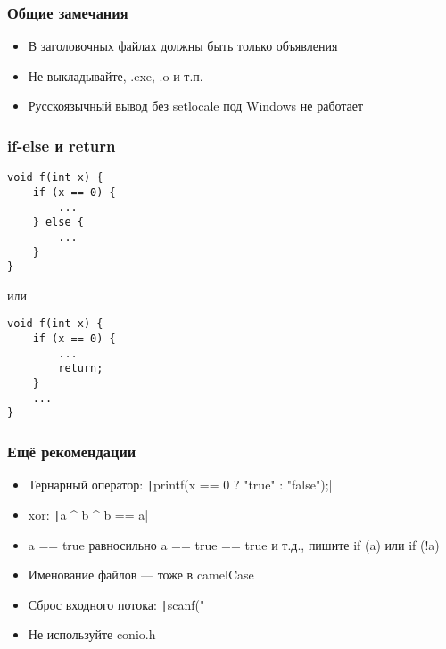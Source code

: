 \documentclass{../../slides-style}
\begin{document}
    
    \begin{frame}[plain]
        \titlepage
    \end{frame}

    \begin{frame}[fragile]
        \frametitle{Общие замечания}
        \begin{itemize}
            \item В заголовочных файлах должны быть только объявления
            \item Не выкладывайте, .exe, .o и т.п.
            \item Русскоязычный вывод без setlocale под Windows не работает
        \end{itemize}
    \end{frame}

    \begin{frame}[fragile]
        \frametitle{if-else и return}
        \begin{verbatim}
void f(int x) {
    if (x == 0) {
        ...
    } else {
        ...
    }
}
        \end{verbatim}
        или
        \begin{verbatim}
void f(int x) {
    if (x == 0) {
        ...
        return;
    } 
    ...
}
        \end{verbatim}
    \end{frame}

    \begin{frame}[fragile]
        \frametitle{Ещё рекомендации}
        \begin{itemize}
            \item Тернарный оператор: \texttt|printf(x == 0 ? "true" :  "false");|
            \item xor: \texttt|a ^ b ^ b == a|
            \item a == true равносильно a == true == true и т.д., пишите if (a) или if (!a)
            \item Именование файлов --- тоже в camelCase
            \item Сброс входного потока: \texttt|scanf("%
            \item Не используйте conio.h
        \end{itemize}
    \end{frame}
\end{document}
